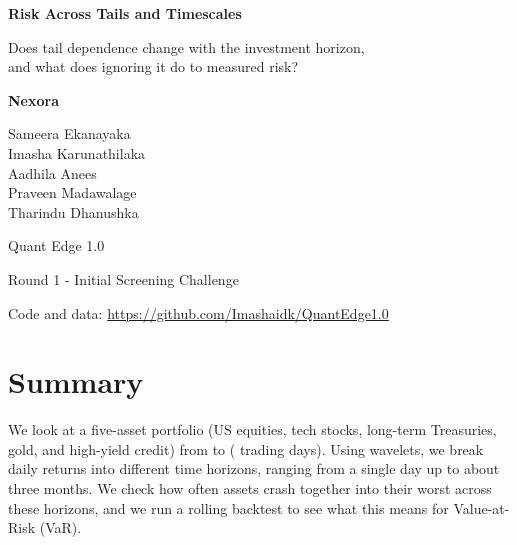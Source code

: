 \documentclass[11pt,a4paper]{article}
\begin{document}
\begin{titlepage}
\centering
\vspace*{3cm}
{\LARGE\bfseries Risk Across Tails and Timescales\par}
\vspace{0.6cm}
{\Large Does tail dependence change with the investment horizon,\\ and what does ignoring it do to measured risk?\par}
\vspace{2cm}
{\large\bfseries Nexora\par}
\vspace{0.5cm}
{\large Sameera Ekanayaka \\ Imasha Karunathilaka \\ Aadhila Anees \\ Praveen Madawalage \\ Tharindu Dhanushka\par}
\vspace{2cm}
{\large Quant Edge 1.0\par}
\vspace{0.3cm}
{\large Round 1 - Initial Screening Challenge\par}
\vfill
{\small Code and data: \url{https://github.com/Imashaidk/QuantEdge1.0}\\}
\end{titlepage}
\setcounter{page}{1}

\section*{Summary}

We look at a five-asset portfolio (US equities, tech stocks, long-term Treasuries, gold, and high-yield credit) from \SampleStart{} to \SampleEnd{} (\SampleDays{} trading days). Using wavelets, we break daily returns into different time horizons, ranging from a single day up to about three months. We check how often assets crash together into their worst \TailLevel{} across these horizons, and we run a rolling backtest to see what this means for Value-at-Risk (VaR).
\end{document}

